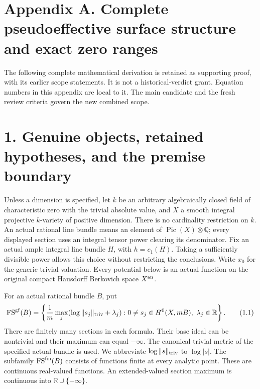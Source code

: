 \documentclass[
  10pt,
]{article}
\begin{document}
\section{Appendix A. Complete pseudoeffective surface structure and
exact zero
ranges}\label{appendix-a.-complete-pseudoeffective-surface-structure-and-exact-zero-ranges}

The following complete mathematical derivation is retained as supporting
proof, with its earlier scope statements. It is not a historical-verdict
grant. Equation numbers in this appendix are local to it. The main
candidate and the fresh review criteria govern the new combined scope.

\section{1. Genuine objects, retained hypotheses, and the premise
boundary}\label{genuine-objects-retained-hypotheses-and-the-premise-boundary}

Unless a dimension is specified, let \(k\) be an arbitrary algebraically
closed field of characteristic zero with the trivial absolute value, and
\(X\) a smooth integral projective \(k\)-variety of positive dimension.
There is no cardinality restriction on \(k\). An actual rational line
bundle means an element of \(\operatorname{Pic}(X)\otimes\mathbb Q\);
every displayed section uses an integral tensor power clearing its
denominator. Fix an actual ample integral line bundle \(H\), with
\(h=c_1(H)\). Taking a sufficiently divisible power allows this choice
without restricting the conclusions. Write \(x_0\) for the generic
trivial valuation. Every potential below is an actual function on the
original compact Hausdorff Berkovich space \(X^{\rm an}\).

For an actual rational bundle \(B\), put \[
 \operatorname{FS}^{\rm gf}(B)=\left\{
  \frac1m\max_j(\log\|s_j\|_{\rm triv}+\lambda_j):
 0\ne s_j\in H^0(X,mB),\ \lambda_j\in\mathbb R
 \right\}.                                                     \tag{1.1}
\] There are finitely many sections in each formula. Their base ideal
can be nontrivial and their maximum can equal \(-\infty\). The canonical
trivial metric of the specified actual bundle is used. We abbreviate
\(\log\|s\|_{\rm triv}\) to \(\log|s|\). The subfamily
\(\operatorname{FS}^{\rm fin}(B)\) consists of functions finite at every
analytic point. These are continuous real-valued functions. An
extended-valued section maximum is continuous into
\(\mathbb R\cup\{-\infty\}\).
\end{document}
